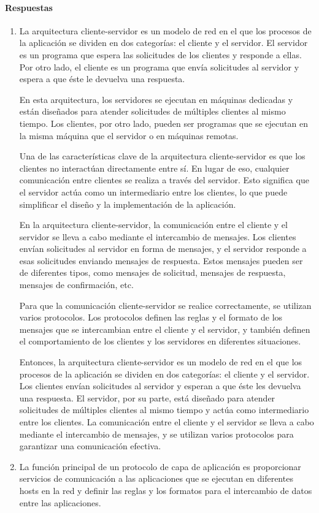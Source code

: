 \documentclass[11pt,a4paper]{article}
\begin{document}
\paragraph{Respuestas}
\begin{enumerate}
    \item La arquitectura cliente-servidor es un modelo de red en el que los procesos de la aplicación se dividen en dos categorías: el cliente y el servidor. El servidor es un programa que espera las solicitudes de los clientes y responde a ellas. Por otro lado, el cliente es un programa que envía solicitudes al servidor y espera a que éste le devuelva una respuesta.
    
    En esta arquitectura, los servidores se ejecutan en máquinas dedicadas y están diseñados para atender solicitudes de múltiples clientes al mismo tiempo. Los clientes, por otro lado, pueden ser programas que se ejecutan en la misma máquina que el servidor o en máquinas remotas.
    
    Una de las características clave de la arquitectura cliente-servidor es que los clientes no interactúan directamente entre sí. En lugar de eso, cualquier comunicación entre clientes se realiza a través del servidor. Esto significa que el servidor actúa como un intermediario entre los clientes, lo que puede simplificar el diseño y la implementación de la aplicación.
    
    En la arquitectura cliente-servidor, la comunicación entre el cliente y el servidor se lleva a cabo mediante el intercambio de mensajes. Los clientes envían solicitudes al servidor en forma de mensajes, y el servidor responde a esas solicitudes enviando mensajes de respuesta. Estos mensajes pueden ser de diferentes tipos, como mensajes de solicitud, mensajes de respuesta, mensajes de confirmación, etc.
    
    Para que la comunicación cliente-servidor se realice correctamente, se utilizan varios protocolos. Los protocolos definen las reglas y el formato de los mensajes que se intercambian entre el cliente y el servidor, y también definen el comportamiento de los clientes y los servidores en diferentes situaciones.
    
    Entonces, la arquitectura cliente-servidor es un modelo de red en el que los procesos de la aplicación se dividen en dos categorías: el cliente y el servidor. Los clientes envían solicitudes al servidor y esperan a que éste les devuelva una respuesta. El servidor, por su parte, está diseñado para atender solicitudes de múltiples clientes al mismo tiempo y actúa como intermediario entre los clientes. La comunicación entre el cliente y el servidor se lleva a cabo mediante el intercambio de mensajes, y se utilizan varios protocolos para garantizar una comunicación efectiva.
    \item La función principal de un protocolo de capa de aplicación es proporcionar servicios de comunicación a las aplicaciones que se ejecutan en diferentes hosts en la red y definir las reglas y los formatos para el intercambio de datos entre las aplicaciones.
    

\end{enumerate}
\end{document}
